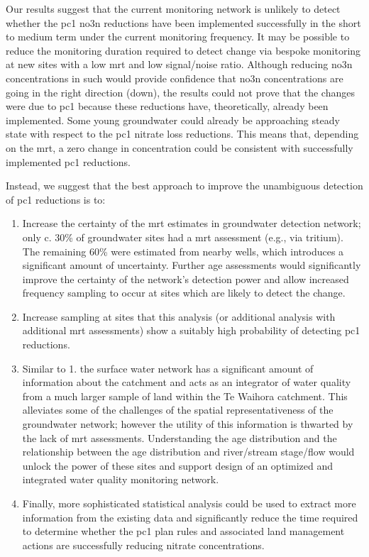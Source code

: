 Our results suggest that the current monitoring network is unlikely to detect whether the \gls{pc1} \gls{no3n} reductions have been implemented successfully in the short to medium term under the current monitoring frequency.
It may be possible to reduce the monitoring duration required to detect change via bespoke monitoring at new sites with a low \gls{mrt} and low signal/noise ratio.
Although reducing \gls{no3n} concentrations in such would provide confidence that \gls{no3n} concentrations are going in the right direction (down), the results could not prove that the changes were due to \gls{pc1} because these reductions have, theoretically, already been implemented.
Some young groundwater could already be approaching steady state with respect to the \gls{pc1} nitrate loss reductions.
This means that, depending on the \gls{mrt}, a zero change in concentration could be consistent with successfully implemented \gls{pc1} reductions.

Instead, we suggest that the best approach to improve the unambiguous detection of \gls{pc1} reductions is to:
\begin{enumerate}
    \item Increase the certainty of the \gls{mrt} estimates in groundwater detection network; only c. 30\% of groundwater sites had a \gls{mrt} assessment (e.g., via tritium). The remaining 60\% were estimated from nearby wells, which introduces a significant amount of uncertainty. Further age assessments would significantly improve the certainty of the network's detection power and allow increased frequency sampling to occur at sites which are likely to detect the change.
    \item Increase sampling at sites that this analysis (or additional analysis with additional \gls{mrt} assessments) show a suitably high probability of detecting \gls{pc1} reductions.
    \item Similar to 1. the surface water network has a significant amount of information about the catchment and acts as an integrator of water quality from a much larger sample of land within the Te Waihora catchment. This alleviates some of the challenges of the spatial representativeness of the groundwater network\citep{olw_guidance}; however the utility of this information is thwarted by the lack of \gls{mrt} assessments. Understanding the age distribution and the relationship between the age distribution and river/stream stage/flow would unlock the power of these sites and support design of an optimized and integrated water quality monitoring network.
    \item Finally, more sophisticated statistical analysis could be used to extract more information from the existing data and significantly reduce the time required to determine whether the \gls{pc1} plan rules and associated land management actions are successfully reducing nitrate concentrations.
\end{enumerate}